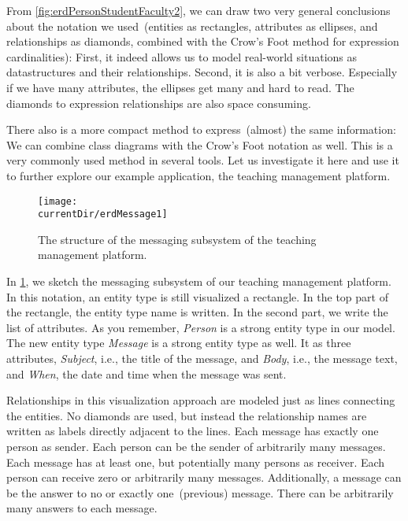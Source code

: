 %
\label{sec:compactCrowsFootNotation}%
%
From \cref{fig:erdPersonStudentFaculty2}, we can draw two very general conclusions about the notation we used~(entities as rectangles, attributes as ellipses, and relationships as diamonds, combined with the Crow's Foot method for expression cardinalities):
First, it indeed allows us to model real-world situations as datastructures and their relationships.
Second, it is also a bit verbose.
Especially if we have many attributes, the ellipses get many and hard to read.
The diamonds to expression relationships are also space consuming.

There also is a more compact method to express~(almost) the same information:
We can combine  class diagrams with the Crow's Foot notation as well.
This is a very commonly used method in several tools.
Let us investigate it here and use it to further explore our example application, the teaching management platform.
%
\begin{figure}%
\centering%
\texttt{[image: \\currentDir/erdMessage1]}%
\caption{The structure of the messaging subsystem of the teaching management platform.}%
\label{fig:erdMessage1}%
\end{figure}%
%
In \cref{fig:erdMessage1}, we sketch the messaging subsystem of our teaching management platform.
In this notation, an entity type is still visualized a rectangle.
In the top part of the rectangle, the entity type name is written.
In the second part, we write the list of attributes.
As you remember, \emph{Person} is a strong entity type in our model.
The new entity type \emph{Message} is a strong entity type as well.
It as three attributes, \emph{Subject}, i.e., the title of the message, and \emph{Body}, i.e., the message text, and \emph{When}, the date and time when the message was sent.

Relationships in this visualization approach are modeled just as lines connecting the entities.
No diamonds are used, but instead the relationship names are written as labels directly adjacent to the lines.
Each message has exactly one person as sender.
Each person can be the sender of arbitrarily many messages.
Each message has at least one, but potentially many persons as receiver.
Each person can receive zero or arbitrarily many messages.
Additionally, a message can be the answer to no or exactly one~(previous) message.
There can be arbitrarily many answers to each message.

